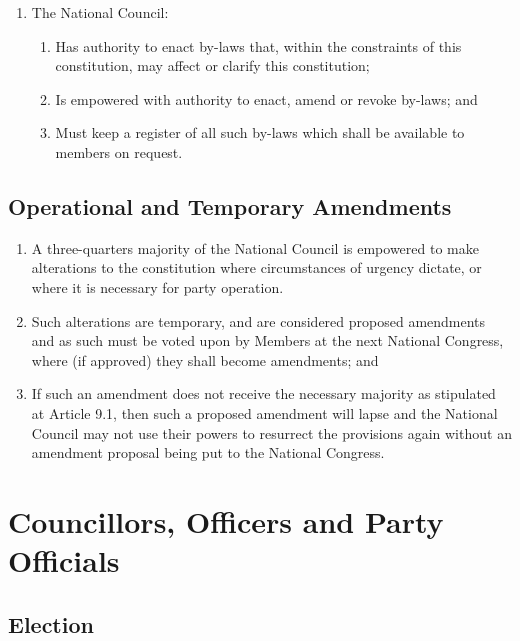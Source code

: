 \documentclass[a4paper,titlepage,8.5pt]{article}
\begin{document}
\begin{enumerate}
\item The National Council:
\begin{enumerate}
\item Has authority to enact by-laws that, within the constraints of this constitution, may affect or clarify this constitution;
\item Is empowered with authority to enact, amend or revoke by-laws; and
\item Must keep a register of all such by-laws which shall be available to members on request.
\end{enumerate}
\end{enumerate}

\subsection{Operational and Temporary Amendments}

\begin{enumerate}
\item A three-quarters majority of the National Council is empowered to make alterations to the constitution where circumstances of urgency dictate, or where it is necessary for party operation.
\item Such alterations are temporary, and are considered proposed amendments and as such must be voted upon by Members at the next National Congress, where (if approved) they shall become amendments; and
\item If such an amendment does not receive the necessary majority as stipulated at Article 9.1, then such a proposed amendment will lapse and the National Council may not use their powers to resurrect the provisions again without an amendment proposal being put to the National Congress.
\end{enumerate}

\section{Councillors, Officers and Party Officials}

\subsection{Election}
\end{document}
